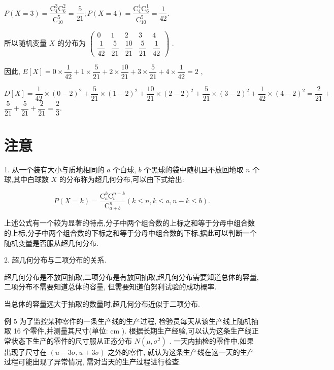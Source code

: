 $P\left( {X = 3}\right)  = \dfrac{{\mathrm{C}}_{4}^{3}{\mathrm{C}}_{6}^{2}}{{\mathrm{C}}_{10}^{5}} = \dfrac{5}{21};P\left( {X = 4}\right)  = \dfrac{{\mathrm{C}}_{4}^{4}{\mathrm{C}}_{6}^{1}}{{\mathrm{C}}_{10}^{5}} = \dfrac{1}{42}.$

所以随机变量 $X$ 的分布为 $\left( \begin{matrix} 0 & 1 & 2 & 3 & 4 \\  \dfrac{1}{42} & \dfrac{5}{21} & \dfrac{10}{21} & \dfrac{5}{21} & \dfrac{1}{42} \end{matrix}\right)$ .

因此, $E\left\lbrack  X\right\rbrack   = 0 \times  \dfrac{1}{42} + 1 \times  \dfrac{5}{21} + 2 \times  \dfrac{10}{21} + 3 \times  \dfrac{5}{21} + 4 \times  \dfrac{1}{42} = 2$ ,

$D\left\lbrack  X\right\rbrack   = \dfrac{1}{42} \times  {\left( 0 - 2\right) }^{2} + \dfrac{5}{21} \times  {\left( 1 - 2\right) }^{2} + \dfrac{10}{21} \times  {\left( 2 - 2\right) }^{2} + \dfrac{5}{21} \times  {\left( 3 - 2\right) }^{2} + \dfrac{1}{42} \times  {\left( 4 - 2\right) }^{2} = \dfrac{2}{21} +$  $\dfrac{5}{21} + \dfrac{5}{21} + \dfrac{2}{21} = \dfrac{2}{3}.$

\section*{注意}

1. 从一个装有大小与质地相同的 $a$ 个白球, $b$ 个黑球的袋中随机且不放回地取 $n$ 个球,其中白球数 $X$ 的分布称为超几何分布,可以由下式给出:

\[
P\left( {X = k}\right)  = \dfrac{{\mathrm{C}}_{a}^{k}{\mathrm{C}}_{b}^{n - k}}{{\mathrm{C}}_{a + b}^{n}}\left( {k \leq  n,k \leq  a,n - k \leq  b}\right) .
\]

上述公式有一个较为显著的特点,分子中两个组合数的上标之和等于分母中组合数的上标,分子中两个组合数的下标之和等于分母中组合数的下标,据此可以判断一个随机变量是否服从超几何分布.

2. 超几何分布与二项分布的关系.

超几何分布是不放回抽取,二项分布是有放回抽取,超几何分布需要知道总体的容量,二项分布不需要知道总体的容量, 但需要知道伯努利试验的成功概率.

当总体的容量远大于抽取的数量时,超几何分布近似于二项分布.

例 5 为了监控某种零件的一条生产线的生产过程, 检验员每天从该生产线上随机抽取 16 个零件,并测量其尺寸(单位: $\mathrm{{cm}}$ ). 根据长期生产经验,可以认为这条生产线正常状态下生产的零件的尺寸服从正态分布 $N\left( {\mu ,{\sigma }^{2}}\right)$ . 一天内抽检的零件中,如果出现了尺寸在 $\left( {u - {3\sigma },u + {3\sigma }}\right)$ 之外的零件, 就认为这条生产线在这一天的生产过程可能出现了异常情况, 需对当天的生产过程进行检查.

